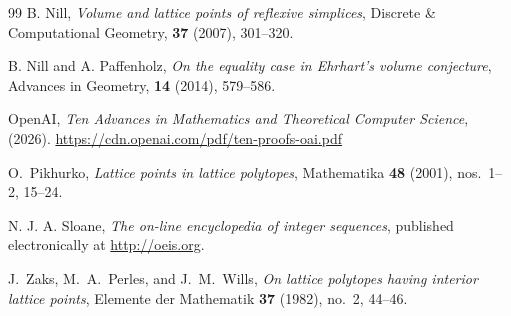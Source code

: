 \documentclass[reqno, 11pt]{article}
\numberwithin{equation}{section}
\theoremstyle{definition}
\numberwithin{equation}{section}
\begin{document}
\begin{thebibliography}{99}
 B. Nill, \emph{Volume and lattice points of reflexive simplices}, Discrete \& Computational Geometry, \textbf{37} (2007), 301--320.


 B. Nill and A. Paffenholz, \emph{On the equality case in Ehrhart's volume conjecture}, Advances in Geometry, \textbf{14} (2014), 579--586.

 OpenAI, \emph{Ten Advances in Mathematics and Theoretical Computer Science}, (2026). \url{https://cdn.openai.com/pdf/ten-proofs-oai.pdf}


 O.~Pikhurko, \emph{Lattice points in lattice polytopes}, Mathematika \textbf{48} (2001), nos.~1--2, 15--24.


 N. J. A. Sloane, \emph{The on-line encyclopedia of integer sequences}, published electronically at \url{http://oeis.org}.

 J.~Zaks, M.~A.~Perles, and J.~M.~Wills, \emph{On lattice polytopes having interior lattice points}, Elemente der Mathematik \textbf{37} (1982), no.~2, 44--46.

\end{thebibliography}
\end{document}
